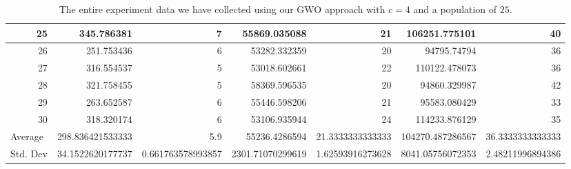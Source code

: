 \begin{table}
\begin{adjustwidth}{}{}
{{\begin{tabular}{|r|r|r|r|r|r|r|}
\hline
25                                         & 345.786381                   & 7                                     & 55869.035088                   & 21                                    & 106251.775101                & 40                                     \\ 
\hline
26                                         & 251.753436                   & 6                                     & 53282.332359                   & 20                                    & 94795.74794                  & 36                                     \\ 
\hline
27                                         & 316.554537                   & 5                                     & 53018.602661                   & 22                                    & 110122.478073                & 36                                     \\ 
\hline
28                                         & 321.758455                   & 5                                     & 58369.596535                   & 20                                    & 94860.329987                 & 42                                     \\ 
\hline
29                                         & 263.652587                   & 6                                     & 55446.598206                   & 21                                    & 95583.080429                 & 33                                     \\ 
\hline
30                                         & 318.320174                   & 6                                     & 53106.935944                   & 24                                    & 114233.876129                & 35                                     \\ 
\hline
\multicolumn{1}{|l|}{Average}              & 298.836421533333             & 5.9                                   & 55236.4286594                  & 21.3333333333333                      & 104270.487286567             & 36.3333333333333                       \\ 
\hline
\multicolumn{1}{|l|}{Std. Dev}             & 34.1522620177737             & 0.661763578993857                     & 2301.71070299619               & 1.62593916273628                      & 8041.05756072353             & 2.48211996894386                       \\
\hline
\end{tabular}}}
\end{adjustwidth}
\caption{The entire experiment data we have collected using our GWO approach with $c = 4$ and a population of $25$.}
\label{full-data-gwo-c4-p25}
\end{table}

